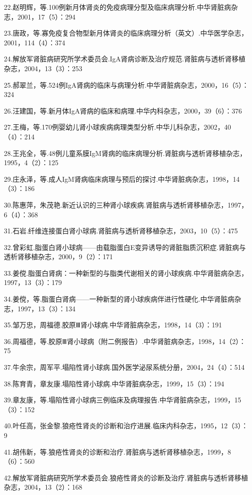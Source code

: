 22.赵明辉，等.100例新月体肾炎的免疫病理分型及临床病理分析.中华肾脏病杂志，2001，17（5）：294

23.唐政，等.寡免疫复合物型新月体肾炎的临床病理分析（英文）.中华医学杂志，2001，114（4）：374

24.解放军肾脏病研究所学术委员会.IgA肾病诊断及治疗规范.肾脏病与透析肾移植杂志，2004，13（3）：253

25.郝翠兰，等.524例IgA肾病的临床与病理分析.中华肾脏病杂志，2000，16（5）：324

26.汪建国，等.新月体IgA肾病的临床和病理.中华内科杂志，2000，39（6）：376

27.王梅，等.170例婴幼儿肾小球疾病病理类型分析.中华儿科杂志，2002，40（4）：214

28.王兆全，等.48例儿童系膜IgM肾病的临床病理分析.肾脏病与透析肾移植杂志，1995，4（2）：125

29.庄永泽，等.成人IgM肾病临床病理与预后的探讨.中华肾脏病杂志，1998，14（3）：186

30.陈惠萍，朱茂艳.新近认识的三种肾小球疾病.肾脏病与透析肾移植杂志，1997，6（4）：368

31.石岩.纤维连接蛋白肾小球病.肾脏病与透析肾移植杂志，2003，10（5）：475

32.曾彩虹.脂蛋白肾小球病------由载脂蛋白E变异诱导的肾脏脂质沉积症.肾脏病与透析肾移植杂志，2000，9（2）：171

33.姜傥.脂蛋白肾病：一种新型的与脂类代谢相关的肾小球疾病.中华肾脏病杂志，1997，13（3）：179

34.姜傥，等.脂蛋白肾病------一种新型的肾小球疾病伴进行性硬化.中华肾脏病杂志，1997，13（3）：134

35.邹万忠，周福德.胶原Ⅲ肾小球病.中华肾脏病杂志，1998，14（3）：191

36.周福德，等.胶原Ⅲ肾小球病（附二例报告）.中华肾脏病杂志，1998，14（2）：75

37.牛余宗，周军平.塌陷性肾小球病.国外医学泌尿系统分册，2004，24（4）：514

38.陈育青，章友康.塌陷性肾小球病.中华肾脏病杂志，1999，15（3）：194

39.章友康，等.塌陷性肾小球病三例临床及病理报告.中华肾脏病杂志，1999，15（3）：152

40.叶任高，张金黎.狼疮性肾炎的诊断和治疗进展.临床内科杂志，1995，12（3）：9

41.胡伟新，等.狼疮性肾炎的诊断和治疗.肾脏病与透析肾移植杂志，1999，8（6）：560

42.解放军肾脏病研究所学术委员会.狼疮性肾炎的诊断及治疗.肾脏病与透析肾移植杂志，2004，13（2）：168

